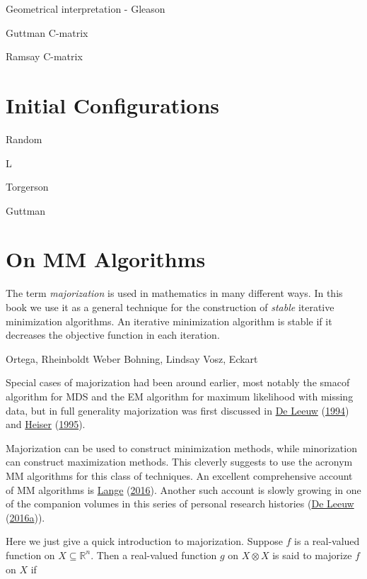 \documentclass[
  12pt,
]{book}
\theoremstyle{definition}
\theoremstyle{definition}
\theoremstyle{definition}
\theoremstyle{definition}
\theoremstyle{remark}
\begin{document}
Geometrical interpretation - Gleason

Guttman C-matrix

Ramsay C-matrix

\hypertarget{initial-configurations}{%
\section{Initial Configurations}\label{initial-configurations}}

Random

L

Torgerson

Guttman

\hypertarget{apmajmin}{%
\section{On MM Algorithms}\label{apmajmin}}

The term \emph{majorization} is used in mathematics in many different ways. In
this book we use it as a general technique for the construction of
\emph{stable} iterative minimization algorithms. An iterative minimization
algorithm is stable if it decreases the objective function in each
iteration.

Ortega, Rheinboldt
Weber
Bohning, Lindsay
Vosz, Eckart

Special cases of majorization had been around earlier, most notably the smacof algorithm for MDS and the EM algorithm for maximum likelihood with missing data, but in full generality majorization was first discussed in \protect\hyperlink{ref-deleeuw_C_94c}{De Leeuw} (\protect\hyperlink{ref-deleeuw_C_94c}{1994}) and \protect\hyperlink{ref-heiser_95}{Heiser} (\protect\hyperlink{ref-heiser_95}{1995}).

Majorization can be used to construct minimization methods,
while minorization can construct maximization methods. This cleverly
suggests to use the acronym MM algorithms for this class of techniques.
An excellent comprehensive account of MM algorithms is \protect\hyperlink{ref-lange_16}{Lange} (\protect\hyperlink{ref-lange_16}{2016}).
Another such account is slowly growing in one of the companion volumes in this
series of personal research histories (\protect\hyperlink{ref-deleeuw_B_16b}{De Leeuw} (\protect\hyperlink{ref-deleeuw_B_16b}{2016a})).

Here we just give a quick introduction to majorization. Suppose \(f\) is a
real-valued function on \(X\subseteq\mathbb{R}^n\). Then a real-valued
function \(g\) on \(X\otimes X\) is said to majorize \(f\) on \(X\) if
\end{document}
